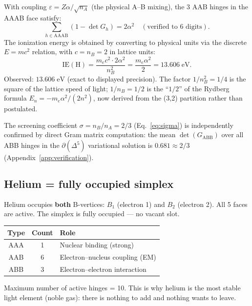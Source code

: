With coupling $\varepsilon = Z\alpha/\sqrt{n_A}$ (the physical A--B mixing), the 3 AAB hinges in the AAAB face satisfy:
\begin{equation}
\sum_{h \in \mathrm{AAAB}}(1 - \det G_h) = 2\alpha^2
\quad (\text{verified to 6 digits}).
\end{equation}
The ionization energy is obtained by converting to physical units via the discrete $E = mc^2$ relation, with $c = n_B = 2$ in lattice units:
\begin{equation}
\boxed{\text{IE}(\text{H}) = \frac{m_e c^2 \cdot 2\alpha^2}{n_B^2} = \frac{m_e \alpha^2}{2} = 13.606\;\text{eV}.}
\end{equation}
Observed: $13.606\;\text{eV}$ (exact to displayed precision).  The factor $1/n_B^2 = 1/4$ is the square of the lattice speed of light; $1/n_B = 1/2$ is the ``$1/2$'' of the Rydberg formula $E_n = -m_e\alpha^2/(2n^2)$, now derived from the (3,2) partition rather than postulated.

\begin{remark}
The screening coefficient $\sigma = n_B/n_A = 2/3$ (Eq.~\ref{eq:sigma}) is independently confirmed by direct Gram matrix computation: the mean $\det(G_\mathrm{ABB})$ over all ABB hinges in the $\partial(\Delta^5)$ variational solution is $0.681 \approx 2/3$ (Appendix~\ref{app:verification}).
\end{remark}

\subsection{Helium = fully occupied simplex}

Helium occupies \textbf{both} B-vertices: $B_1$ (electron 1) and $B_2$ (electron 2). All 5 faces are active. The simplex is fully occupied --- no vacant slot.

\begin{center}
\begin{tabular}{ccl}
\hline
Type & Count & Role \\
\hline
AAA & 1 & Nuclear binding (strong) \\
AAB & 6 & Electron--nucleus coupling (EM) \\
ABB & 3 & Electron--electron interaction \\
\hline
\end{tabular}
\end{center}

Maximum number of active hinges = 10. This is why helium is the most stable light element (noble gas): there is nothing to add and nothing wants to leave.

